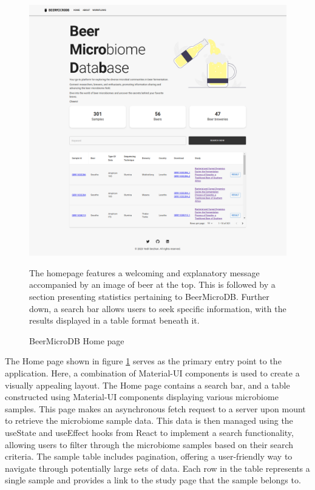             \begin{figure}[H]
                \centering
                \includegraphics[scale=0.3]{images/home_page.png}
                \caption{BeerMicroDB Home page}
                \small The homepage features a welcoming and explanatory message accompanied by an image of beer at the top. This is followed by a section presenting statistics pertaining to BeerMicroDB. Further down, a search bar allows users to seek specific information, with the results displayed in a table format beneath it.
                \label{fig:methods:beermicrodb_home_page}
            \end{figure}  

            The Home page shown in figure \ref{fig:methods:beermicrodb_home_page} serves as the primary entry point to the application. Here, a combination of Material-UI components is used to create a visually appealing layout. The Home page contains a search bar, and a table constructed using Material-UI components displaying various microbiome samples. This page makes an asynchronous fetch request to a server upon mount to retrieve the microbiome sample data. This data is then managed using the useState and useEffect hooks from React to implement a search functionality, allowing users to filter through the microbiome samples based on their search criteria. The sample table includes pagination, offering a user-friendly way to navigate through potentially large sets of data. Each row in the table represents a single sample and provides a link to the study page that the sample belongs to. 

